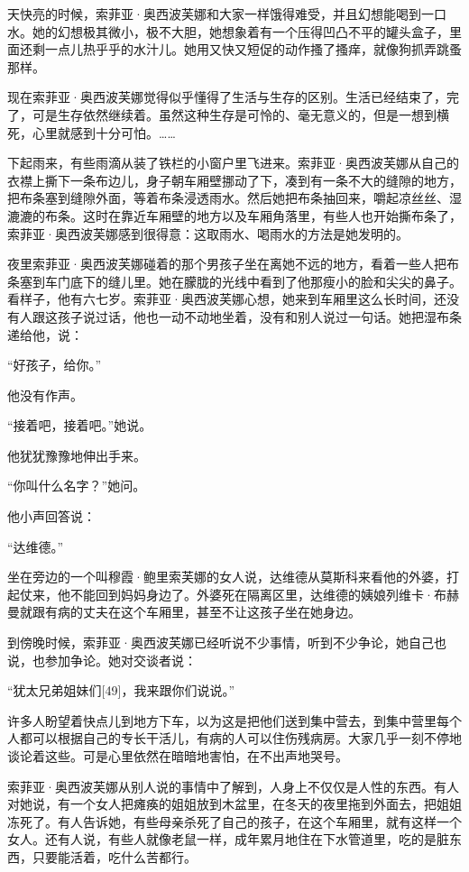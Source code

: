 天快亮的时候，索菲亚·奥西波芙娜和大家一样饿得难受，并且幻想能喝到一口水。她的幻想极其微小，极不大胆，她想象着有一个压得凹凸不平的罐头盒子，里面还剩一点儿热乎乎的水汁儿。她用又快又短促的动作搔了搔痒，就像狗抓弄跳蚤那样。

现在索菲亚·奥西波芙娜觉得似乎懂得了生活与生存的区别。生活已经结束了，完了，可是生存依然继续着。虽然这种生存是可怜的、毫无意义的，但是一想到横死，心里就感到十分可怕。……

下起雨来，有些雨滴从装了铁栏的小窗户里飞进来。索菲亚·奥西波芙娜从自己的衣襟上撕下一条布边儿，身子朝车厢壁挪动了下，凑到有一条不大的缝隙的地方，把布条塞到缝隙外面，等着布条浸透雨水。然后她把布条抽回来，嚼起凉丝丝、湿漉漉的布条。这时在靠近车厢壁的地方以及车厢角落里，有些人也开始撕布条了，索菲亚·奥西波芙娜感到很得意：这取雨水、喝雨水的方法是她发明的。

夜里索菲亚·奥西波芙娜碰着的那个男孩子坐在离她不远的地方，看着一些人把布条塞到车门底下的缝儿里。她在朦胧的光线中看到了他那瘦小的脸和尖尖的鼻子。看样子，他有六七岁。索菲亚·奥西波芙娜心想，她来到车厢里这么长时间，还没有人跟这孩子说过话，他也一动不动地坐着，没有和别人说过一句话。她把湿布条递给他，说：

“好孩子，给你。”

他没有作声。

“接着吧，接着吧。”她说。

他犹犹豫豫地伸出手来。

“你叫什么名字？”她问。

他小声回答说：

“达维德。”

坐在旁边的一个叫穆霞·鲍里索芙娜的女人说，达维德从莫斯科来看他的外婆，打起仗来，他不能回到妈妈身边了。外婆死在隔离区里，达维德的姨娘列维卡·布赫曼就跟有病的丈夫在这个车厢里，甚至不让这孩子坐在她身边。

到傍晚时候，索菲亚·奥西波芙娜已经听说不少事情，听到不少争论，她自己也说，也参加争论。她对交谈者说：

“犹太兄弟姐妹们[49]，我来跟你们说说。”

许多人盼望着快点儿到地方下车，以为这是把他们送到集中营去，到集中营里每个人都可以根据自己的专长干活儿，有病的人可以住伤残病房。大家几乎一刻不停地谈论着这些。可是心里依然在暗暗地害怕，在不出声地哭号。

索菲亚·奥西波芙娜从别人说的事情中了解到，人身上不仅仅是人性的东西。有人对她说，有一个女人把瘫痪的姐姐放到木盆里，在冬天的夜里拖到外面去，把姐姐冻死了。有人告诉她，有些母亲杀死了自己的孩子，在这个车厢里，就有这样一个女人。还有人说，有些人就像老鼠一样，成年累月地住在下水管道里，吃的是脏东西，只要能活着，吃什么苦都行。

